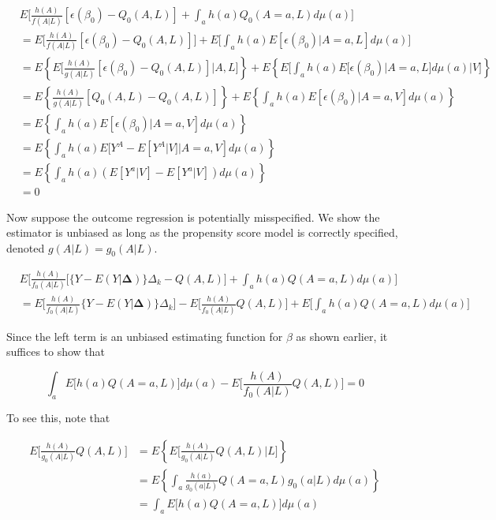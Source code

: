 \documentclass[12pt]{article}
\begin{document}
\begin{align*}
&E \bigg[\frac{h(A)}{f(A | L)}[\epsilon(\beta_{0}) - Q_{0}(A, L)] + \int_{a} h(a)Q_{0}(A = a, L)d\mu (a) \bigg] \\
&= E \bigg[\frac{h(A)}{f(A | L)}[\epsilon(\beta_{0}) - Q_{0}(A, L)] \bigg] + E \bigg[\int_{a} h(a)E[\epsilon(\beta_{0}) | A = a, L]d\mu (a) \bigg] \\
&= E \left \{ E \bigg[\frac{h(A)}{g(A | L)}[\epsilon(\beta_{0}) - Q_{0}(A, L)] | A, L \bigg] \right \} + E \left \{ E \bigg[\int_{a} h(a)E[\epsilon(\beta_{0}) | A = a, L]d\mu (a) | V \bigg] \right \} \\
&= E \left \{ \frac{h(A)}{g(A | L)}[Q_{0}(A, L) - Q_{0}(A, L)] \right \} + E \left \{ \int_{a} h(a)E[\epsilon(\beta_{0}) | A = a, V]d\mu (a) \right \} \\
&= E \left \{ \int_{a} h(a)E[\epsilon(\beta_{0}) | A = a, V]d\mu (a) \right \} \\
&= E \left \{ \int_{a} h(a)E[Y^{A} - E[Y^{A} | V] | A = a, V]d\mu (a) \right \} \\
&= E \left \{ \int_{a} h(a)(E[Y^{a} | V] - E[Y^{a} |V])d\mu (a) \right \} \\
&= 0
\end{align*}


Now suppose the outcome regression is potentially misspecified. We show the estimator is unbiased as long as the propensity score model is correctly specified, denoted $g(A|L) = g_{0}(A|L)$.

\begin{align*}
&E \bigg[\frac{h(A)}{f_{0}(A | L)} \bigg[ \{ Y - E(Y | \bm{\Delta})\} \Delta_{k} - Q(A, L) \bigg] + \int_{a} h(a)Q(A = a, L)d\mu (a) \bigg] \\
&= E \bigg[\frac{h(A)}{f_{0}(A | L)}\{ Y - E(Y | \bm{\Delta})\} \Delta_{k} \bigg] - E \bigg[\frac{h(A)}{f_{0}(A | L)}Q(A, L) \bigg] + E \bigg[ \int_{a} h(a)Q(A = a, L)d\mu (a) \bigg]
\end{align*}

Since the left term is an unbiased estimating function for $\beta$ as shown earlier, it suffices to show that

\begin{equation*}
\int_{a} E \bigg[ h(a)Q(A = a, L) \bigg] d\mu (a) - E \bigg[\frac{h(A)}{f_{0}(A | L)}Q(A, L) \bigg] = 0
\end{equation*}

To see this, note that

\begin{align*}
E \bigg[\frac{h(A)}{g_{0}(A | L)}Q(A, L) \bigg] &= E \left \{ E \bigg[\frac{h(A)}{g_{0}(A | L)}Q(A, L) | L \bigg] \right \} \\
&= E \left \{ \int_{a} \frac{h(a)}{g_{0}(a | L)}Q(A = a, L) g_{0}(a | L) d\mu (a) \right \} \\
&= \int_{a} E \bigg[ h(a)Q(A = a, L) \bigg] d\mu (a)
\end{align*}
\end{document}
